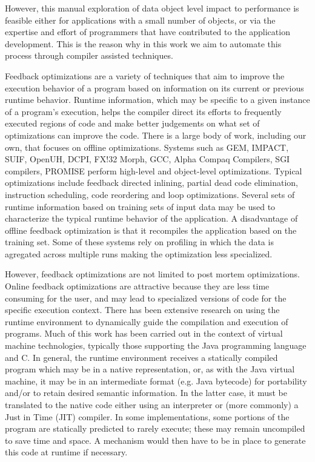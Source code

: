 However, this manual exploration of data object level impact to performance is feasible either for applications with a small number of objects, or via the expertise and effort of programmers that have contributed to the application development. This is the reason why in this work we aim to automate this process through compiler assisted techniques. 

Feedback optimizations are a variety  of techniques that aim to improve
the execution behavior of a program based on information on its current or
previous runtime behavior. Runtime
information, which may be specific to a given instance of a program's
execution, helps the compiler direct its efforts to frequently
executed regions of code and make better judgements on what set of
optimizations can  improve the code.  There is a large body of work, including
our own, that  focuses on offline optimizations. Systems such as GEM,
IMPACT, SUIF, OpenUH, DCPI, FX!32 Morph, GCC, Alpha Compaq Compilers, SGI compilers, PROMISE
perform high-level and object-level optimizations. Typical optimizations include 
feedback directed inlining, partial dead code elimination, 
instruction scheduling, code reordering and loop optimizations. 
Several sets of  runtime information based on training sets of input data may be used to characterize the typical runtime behavior of the application. 
A disadvantage of offline feedback optimization is that it recompiles the application based on the training set. Some of these
systems rely on profiling in which the data is agregated across multiple runs making the optimization 
less specialized.

However, feedback optimizations are not limited to post mortem
optimizations.
Online feedback optimizations are attractive because they are less time consuming for the user, and may lead to specialized versions of code for the specific execution context. 
There has been extensive research on using the runtime environment to
dynamically guide the compilation and execution of programs. Much of this work
has been carried out in the context of virtual machine technologies, typically
those supporting the Java programming language and C.  In general, the runtime
environment receives a statically compiled program which may be in a native
representation, or, as with the Java virtual machine, it may be in an
intermediate format (e.g. Java bytecode) for portability and/or to retain
desired semantic information.  In the latter case, it must be translated to
the native code either using an interpreter or (more commonly) a Just in Time
(JIT) compiler.  In some implementations, some portions of the program are
statically predicted to rarely execute; these may remain uncompiled to save
time and space. A mechanism would then have to be in place to generate this
code at runtime if necessary.

